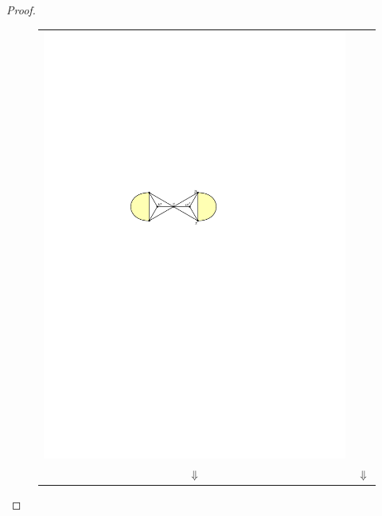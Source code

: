\documentclass[12pt]{article}
\theoremstyle{definition}
\begin{document}
\begin{proof}
\begin{figure}[htpb]
\begin{tabular}{cc}
      \includegraphics[page=3]{figs/isolated} \\
      $\Downarrow$ & $\Downarrow$ \\

\end{tabular}
\end{figure}
\end{proof}
\end{document}
